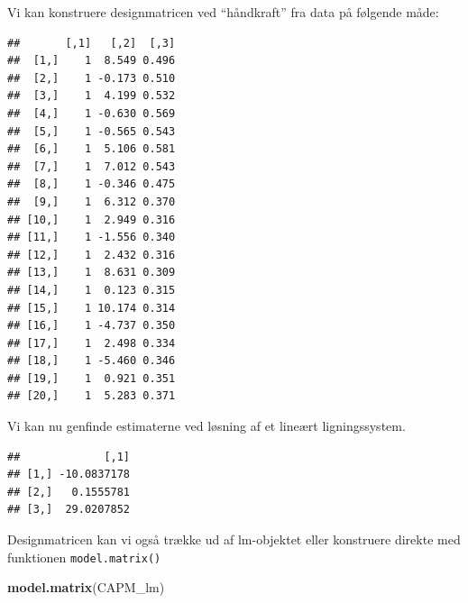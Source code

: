 \documentclass[
]{article}
\newenvironment{Shaded}{\begin{snugshade}}{\end{snugshade}}
\newcommand{\DataTypeTok}[1]{\textcolor[rgb]{0.13,0.29,0.53}{#1}}
\newcommand{\DecValTok}[1]{\textcolor[rgb]{0.00,0.00,0.81}{#1}}
\newcommand{\KeywordTok}[1]{\textcolor[rgb]{0.13,0.29,0.53}{\textbf{#1}}}
\newcommand{\NormalTok}[1]{#1}
\newcommand{\OperatorTok}[1]{\textcolor[rgb]{0.81,0.36,0.00}{\textbf{#1}}}
\newcommand{\StringTok}[1]{\textcolor[rgb]{0.31,0.60,0.02}{#1}}
\begin{document}
Vi kan konstruere designmatricen ved ``håndkraft'' fra data på følgende
måde:

\begin{Shaded}
\end{Shaded}

\begin{verbatim}
##       [,1]   [,2]  [,3]
##  [1,]    1  8.549 0.496
##  [2,]    1 -0.173 0.510
##  [3,]    1  4.199 0.532
##  [4,]    1 -0.630 0.569
##  [5,]    1 -0.565 0.543
##  [6,]    1  5.106 0.581
##  [7,]    1  7.012 0.543
##  [8,]    1 -0.346 0.475
##  [9,]    1  6.312 0.370
## [10,]    1  2.949 0.316
## [11,]    1 -1.556 0.340
## [12,]    1  2.432 0.316
## [13,]    1  8.631 0.309
## [14,]    1  0.123 0.315
## [15,]    1 10.174 0.314
## [16,]    1 -4.737 0.350
## [17,]    1  2.498 0.334
## [18,]    1 -5.460 0.346
## [19,]    1  0.921 0.351
## [20,]    1  5.283 0.371
\end{verbatim}

Vi kan nu genfinde estimaterne ved løsning af et lineært ligningssystem.

\begin{Shaded}
\end{Shaded}

\begin{verbatim}
##             [,1]
## [1,] -10.0837178
## [2,]   0.1555781
## [3,]  29.0207852
\end{verbatim}

Designmatricen kan vi også trække ud af lm-objektet eller konstruere
direkte med funktionen \texttt{model.matrix()}

\begin{Shaded}
\begin{Highlighting}[]
\KeywordTok{model.matrix}\NormalTok{(CAPM_lm)}
\end{Highlighting}
\end{Shaded}
\end{document}
